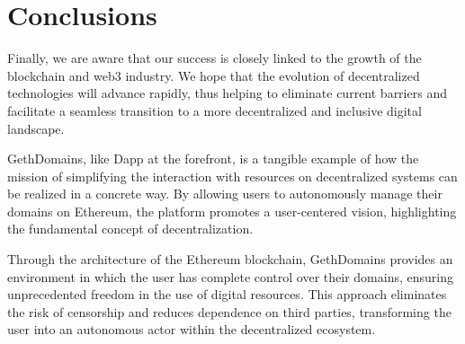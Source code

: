 \documentclass[main.tex]{subfiles}
\begin{document}
\section{Conclusions}\label{sec:conclusions}
Finally, we are aware that our success is closely linked to the growth of the blockchain and web3 industry. We hope that the evolution of decentralized technologies will advance rapidly, thus helping to eliminate current barriers and facilitate a seamless transition to a more decentralized and inclusive digital landscape.

GethDomains, like Dapp at the forefront, is a tangible example of how the mission of simplifying the interaction with resources on decentralized systems can be realized in a concrete way. By allowing users to autonomously manage their domains on Ethereum, the platform promotes a user-centered vision, highlighting the fundamental concept of decentralization.

Through the architecture of the Ethereum blockchain, GethDomains provides an environment in which the user has complete control over their domains, ensuring unprecedented freedom in the use of digital resources. This approach eliminates the risk of censorship and reduces dependence on third parties, transforming the user into an autonomous actor within the decentralized ecosystem.
\end{document}
